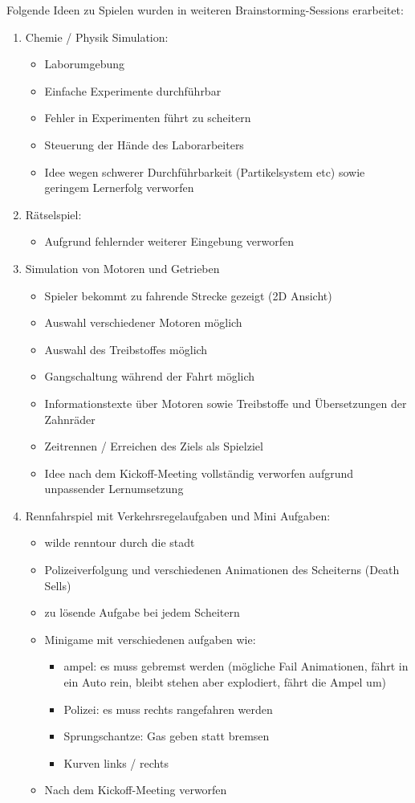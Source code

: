 Folgende Ideen zu Spielen wurden in weiteren Brainstorming-Sessions erarbeitet:
\begin{enumerate}
	\item Chemie / Physik Simulation:
	\begin{itemize}
		\item Laborumgebung
		\item Einfache Experimente durchführbar
		\item Fehler in Experimenten führt zu scheitern
		\item Steuerung der Hände des Laborarbeiters
		\item Idee wegen schwerer Durchführbarkeit (Partikelsystem etc) sowie geringem Lernerfolg verworfen
	\end{itemize}
	\item Rätselspiel:
	\begin{itemize}
		\item Aufgrund fehlernder weiterer Eingebung verworfen
	\end{itemize}
	\item Simulation von Motoren und Getrieben
	\begin{itemize}
		\item Spieler bekommt zu fahrende Strecke gezeigt (2D Ansicht)
		\item Auswahl verschiedener Motoren möglich
		\item Auswahl des Treibstoffes möglich
		\item Gangschaltung während der Fahrt möglich
		\item Informationstexte über Motoren sowie Treibstoffe und Übersetzungen der Zahnräder
		\item Zeitrennen / Erreichen des Ziels als Spielziel
		\item Idee nach dem Kickoff-Meeting vollständig verworfen aufgrund unpassender Lernumsetzung
	\end{itemize}
	\newpage
	\item Rennfahrspiel mit Verkehrsregelaufgaben und Mini Aufgaben:
	\begin{itemize}
		\item wilde renntour durch die stadt
		\item Polizeiverfolgung und verschiedenen Animationen des Scheiterns (Death Sells)
		\item zu lösende Aufgabe bei jedem Scheitern
		\item Minigame mit verschiedenen aufgaben wie:
		\begin{itemize}
			\item ampel: es muss gebremst werden (mögliche Fail Animationen, fährt in ein Auto rein, bleibt stehen aber explodiert, fährt die Ampel um)
			\item Polizei: es muss rechts rangefahren werden
			\item Sprungschantze: Gas geben statt bremsen
			\item Kurven links / rechts
		\end{itemize}
		\item Nach dem Kickoff-Meeting verworfen
	\end{itemize}
\end{enumerate}


